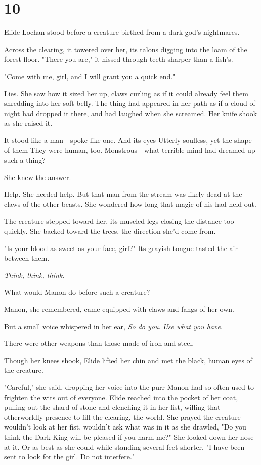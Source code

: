 
\chapter{10}

Elide Lochan stood before a creature birthed from a dark god's nightmares.

Across the clearing, it towered over her, its talons digging into the loam of the forest floor. "There you are," it hissed through teeth sharper than a fish's.

"Come with me, girl, and I will grant you a quick end."

Lies. She saw how it sized her up, claws curling as if it could already feel them shredding into her soft belly. The thing had appeared in her path as if a cloud of night had dropped it there, and had laughed when she screamed. Her knife shook as she raised it.

It stood like a man---spoke like one. And its eyes  Utterly soulless, yet the shape of them  They were human, too. Monstrous---what terrible mind had dreamed up such a thing?

She knew the answer.

Help. She needed help. But that man from the stream was likely dead at the claws of the other beasts. She wondered how long that magic of his had held out.

The creature stepped toward her, its muscled legs closing the distance too quickly. She backed toward the trees, the direction she'd come from.

"Is your blood as sweet as your face, girl?" Its grayish tongue tasted the air between them.

\emph{Think, think, think}.

What would Manon do before such a creature?

Manon, she remembered, came equipped with claws and fangs of her own.

But a small voice whispered in her ear, \emph{So do you}. \emph{Use what you have}.

There were other weapons than those made of iron and steel.

Though her knees shook, Elide lifted her chin and met the black, human eyes of the creature.

"Careful," she said, dropping her voice into the purr Manon had so often used to frighten the wits out of everyone. Elide reached into the pocket of her coat, pulling out the shard of stone and clenching it in her fist, willing that otherworldly presence to fill the clearing, the world. She prayed the creature wouldn't look at her fist, wouldn't ask what was in it as she drawled, "Do you think the Dark King will be pleased if you harm me?" She looked down her nose at it. Or as best as she could while standing several feet shorter. "I have been sent to look for the girl. Do not interfere."

